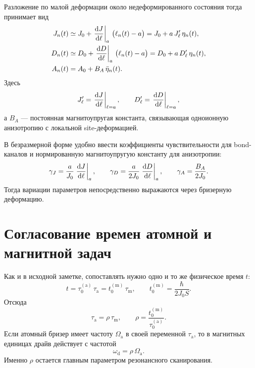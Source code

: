\documentclass[12pt,a4paper]{article}
\newcommand{\ta}{\tau_{\mathrm{a}}}
\newcommand{\tm}{\tau_{\mathrm{m}}}
\begin{document}
Разложение по малой деформации около недеформированного состояния тогда принимает вид
\begin{align}
J_n(t) &\simeq J_0 + \eval{\dv{J}{\ell}}_{a}\,\bigl(\ell_n(t)-a\bigr)
= J_0 + a\,J_\ell'\,\eta_n(t),
\label{eq:J_expand}\\
D_n(t) &\simeq D_0 + \eval{\dv{D}{\ell}}_{a}\,\bigl(\ell_n(t)-a\bigr)
= D_0 + a\,D_\ell'\,\eta_n(t),
\label{eq:D_expand}\\
A_n(t) &= A_0 + B_A\,\bar\eta_n(t).
\label{eq:A_expand}
\end{align}
Здесь
\begin{equation}
J_\ell'=\eval{\dv{J}{\ell}}_{\ell=a},
\qquad
D_\ell'=\eval{\dv{D}{\ell}}_{\ell=a},
\end{equation}
а $B_A$ --- постоянная магнитоупругая константа, связывающая одноионную анизотропию с локальной site-деформацией.

В безразмерной форме удобно ввести коэффициенты чувствительности для bond-каналов и нормированную магнитоупругую константу для анизотропии:
\begin{equation}
\gamma_J = \frac{a}{J_0}\eval{\dv{J}{\ell}}_{a},
\qquad
\gamma_D = \frac{a}{2J_0}\eval{\dv{D}{\ell}}_{a},
\qquad
\gamma_A = \frac{B_A}{2J_0}.
\label{eq:gamma_defs}
\end{equation}
Тогда вариации параметров непосредственно выражаются через бризерную деформацию.

\section{Согласование времен атомной и магнитной задач}
Как и в исходной заметке, сопоставлять нужно одно и то же физическое время $t$:
\begin{equation}
 t = \tau_0^{(\mathrm a)}\,\ta = t_0^{(\mathrm m)}\,\tm,
 \qquad
 t_0^{(\mathrm m)}=\frac{\hbar}{2J_0 S}.
\label{eq:physical_time_relation_new}
\end{equation}
Отсюда
\begin{equation}
\ta = \rho\,\tm,
\qquad
\rho = \frac{t_0^{(\mathrm m)}}{\tau_0^{(\mathrm a)}}.
\label{eq:rho_def_new}
\end{equation}
Если атомный бризер имеет частоту $\Omega_{\mathrm a}$ в своей переменной $\ta$, то в магнитных единицах драйв действует с частотой
\begin{equation}
\omega_{\mathrm d}=\rho\,\Omega_{\mathrm a}.
\label{eq:omega_drive}
\end{equation}
Именно $\rho$ остается главным параметром резонансного сканирования.
\end{document}
